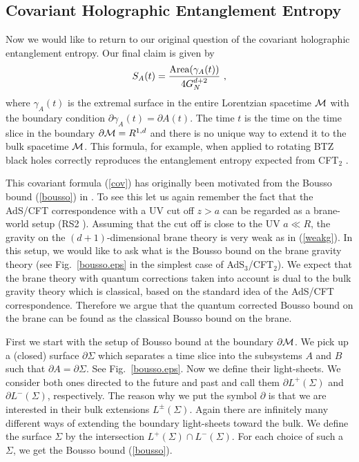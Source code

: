 \documentclass[12pt]{article}
\def\frac#1#2{{#1\over #2}}
\def\frac#1#2{{#1\over #2}}
\begin{document}
\subsection{Covariant Holographic Entanglement Entropy}
\hspace{5mm}
Now we would like to return to our original question of the
covariant holographic entanglement entropy. Our final claim
\cite{Hubeny:2007xt} is given by
\begin{equation}\label{cov}
    S_{A}(t)=\frac{\mbox{Area}(\gamma_{A}(t))}{4G^{d+2}_N}\ ,
\end{equation}
where $\gamma_A(t)$ is the extremal surface in the entire Lorentzian
spacetime ${\cal M}$ with the boundary condition $\partial
\gamma_A(t)=\partial A(t)$. The time $t$ is the time on the time
slice in the boundary $\partial {\cal M}=R^{1,d}$ and there is no unique way to
extend it to the bulk spacetime ${\cal M}$. This formula, for example, when applied to
 rotating BTZ black holes correctly
reproduces the entanglement entropy expected from CFT$_2$
\cite{Hubeny:2007xt}.

This covariant formula (\ref{cov}) has originally been motivated
from the Bousso bound (\ref{bousso}) in \cite{Hubeny:2007xt}.
To see this let us again
remember the fact that the AdS/CFT correspondence with a UV cut off
$z>a$ can be regarded as a brane-world setup (RS2 \cite{RS}).
Assuming that the cut off is close to the UV $a\ll R$, the gravity on
the $(d+1)$-dimensional brane theory is very weak as in (\ref{weakg}).
In this setup, we would like to ask what is the Bousso bound on the brane
gravity theory (see Fig.\ \ref{bousso.eps} in the simplest case of
AdS$_3$/CFT$_2$). We expect that the brane theory with quantum
corrections taken into account is dual to the bulk gravity theory
which is classical, based on the standard idea of the AdS/CFT
correspondence. Therefore we argue that the quantum corrected Bousso
bound on the brane can be found as the classical Bousso bound on the
brane.

First we start with the setup of Bousso bound at the boundary
$\partial {\cal M}$. We pick up a (closed) surface $\partial \Sigma$ which
separates a time slice into the subsystems $A$ and $B$ such that
$\partial A=\partial \Sigma$.
See
Fig.\ \ref{bousso.eps}.
Now we define their light-sheets.
We consider both ones directed to the future and past
and
call them $\partial L^+(\Sigma)$ and $\partial L^-(\Sigma)$,
respectively.
The
reason why we put the symbol $\partial$ is that we are interested in
their bulk extensions $L^\pm(\Sigma)$. Again there are infinitely
many different ways of extending the boundary light-sheets toward
the bulk. We define the surface $\Sigma$ by the intersection
$L^+(\Sigma)\cap L^-(\Sigma)$. For each choice of such a $\Sigma$, we get
the Bousso bound (\ref{bousso}).
\end{document}
